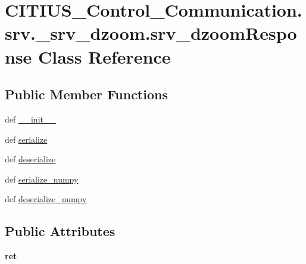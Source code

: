 \hypertarget{class_c_i_t_i_u_s___control___communication_1_1srv_1_1__srv__dzoom_1_1srv__dzoom_response}{\section{\-C\-I\-T\-I\-U\-S\-\_\-\-Control\-\_\-\-Communication.\-srv.\-\_\-srv\-\_\-dzoom.\-srv\-\_\-dzoom\-Response \-Class \-Reference}
\label{class_c_i_t_i_u_s___control___communication_1_1srv_1_1__srv__dzoom_1_1srv__dzoom_response}
}
\subsection*{\-Public \-Member \-Functions}
\begin{DoxyCompactItemize}
\item 
def \hyperlink{class_c_i_t_i_u_s___control___communication_1_1srv_1_1__srv__dzoom_1_1srv__dzoom_response_ae69fdecac94121e5fccf5a23a7cb7d34}{\-\_\-\-\_\-init\-\_\-\-\_\-}
\item 
def \hyperlink{class_c_i_t_i_u_s___control___communication_1_1srv_1_1__srv__dzoom_1_1srv__dzoom_response_a509fce7181fa1f371e86d163fefdba5d}{serialize}
\item 
def \hyperlink{class_c_i_t_i_u_s___control___communication_1_1srv_1_1__srv__dzoom_1_1srv__dzoom_response_a319e53a43a3a7bbd0aa1012f6c303f27}{deserialize}
\item 
def \hyperlink{class_c_i_t_i_u_s___control___communication_1_1srv_1_1__srv__dzoom_1_1srv__dzoom_response_ae275fbaecb49cb645a39e277d6ea8147}{serialize\-\_\-numpy}
\item 
def \hyperlink{class_c_i_t_i_u_s___control___communication_1_1srv_1_1__srv__dzoom_1_1srv__dzoom_response_a53541e17da71400b6b810f0690f3cd10}{deserialize\-\_\-numpy}
\end{DoxyCompactItemize}
\subsection*{\-Public \-Attributes}
\begin{DoxyCompactItemize}
\item 
\hypertarget{class_c_i_t_i_u_s___control___communication_1_1srv_1_1__srv__dzoom_1_1srv__dzoom_response_a884ff41be178a03bfc381adedcb4b735}{{\bfseries ret}}\label{class_c_i_t_i_u_s___control___communication_1_1srv_1_1__srv__dzoom_1_1srv__dzoom_response_a884ff41be178a03bfc381adedcb4b735}

\end{DoxyCompactItemize}

